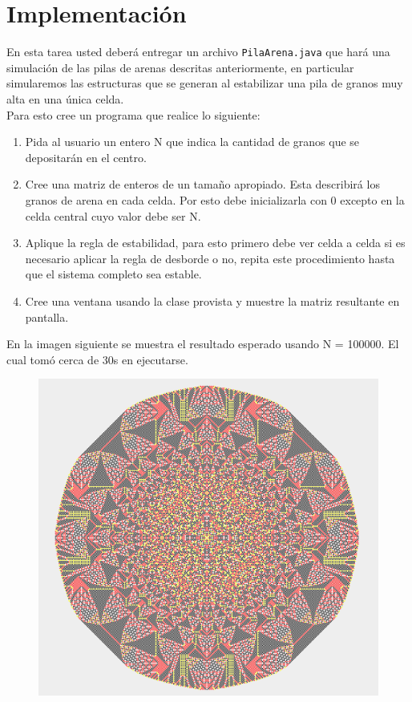 \documentclass[dcc]{fcfmcourse}
\begin{document}
\newpage
\section{Implementación}
En esta tarea usted deberá entregar un archivo \texttt{PilaArena.java} que hará una simulación de las pilas de arenas descritas anteriormente, en particular simularemos las estructuras que se generan al estabilizar una pila de granos muy alta en una única celda. \\

Para esto cree un programa que realice lo siguiente:

\begin{enumerate}
    \item Pida al usuario un entero N que indica la cantidad de granos que se depositarán en el centro.
    \item Cree una matriz de enteros de un tamaño apropiado. Esta describirá los granos de arena en cada celda. Por esto debe inicializarla con 0 excepto en la celda central cuyo valor debe ser N.
    \item Aplique la regla de estabilidad, para esto primero debe ver celda a celda si es necesario aplicar la regla de desborde o no, repita este procedimiento hasta que el sistema completo sea estable.
    \item Cree una ventana usando la clase provista y muestre la matriz resultante en pantalla.
\end{enumerate}

En la imagen siguiente se muestra el resultado esperado usando N = 100000. El cual tomó cerca de 30s en ejecutarse.

\begin{figure}[!ht]
    \centering
    \includegraphics[scale=0.35]{imagenes/res.png}
\end{figure}
\end{document}
